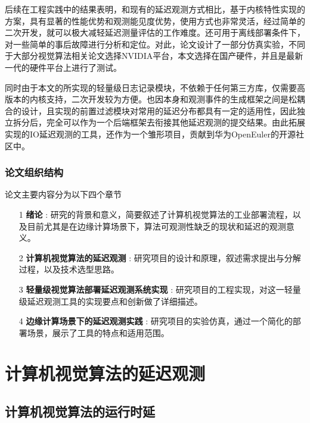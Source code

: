 \documentclass[master,anonymous]{shtthesis}
\begin{document}
后续在工程实践中的结果表明，和现有的延迟观测方式相比，基于内核特性实现的方案，具有显著的性能优势和观测能见度优势，使用方式也非常灵活，经过简单的二次开发，就可以极大减轻延迟测量评估的工作难度。还可用于离线部署条件下，对一些简单的事后故障进行分析和定位。对此，论文设计了一部分仿真实验，不同于大部分视觉算法相关论文选择NVIDIA平台，本文选择在国产硬件，并且是最新一代的硬件平台上进行了测试。

同时由于本文的所实现的轻量级日志记录模块，不依赖于任何第三方库，仅需要高版本的内核支持，二次开发较为方便。也因本身和观测事件的生成框架之间是松耦合的设计，且实现的前置过滤模块对常用的延迟分布都具有一定的适用性，因此独立拆分后，完全可以作为一个后端框架去衔接其他延迟观测的提交结果。由此拓展实现的IO延迟观测的工具，还作为一个雏形项目，贡献到华为OpenEuler的开源社区中\cite{stortrace}。

\subsection{论文组织结构}\label{论文组织结构}
论文主要内容分为以下四个章节
\begin{itemize}
	\item[1]\textbf{绪论} : 研究的背景和意义，简要叙述了计算机视觉算法的工业部署流程，以及目前尤其是在边缘计算场景下，算法可观测性缺乏的现状和延迟的观测意义。
	\item[2]\textbf{计算机视觉算法的延迟观测} : 研究项目的设计和原理，叙述需求提出与分解过程，以及技术选型思路。
	\item[3]\textbf{轻量级视觉算法部署延迟观测系统实现} : 研究项目的工程实现，对这一轻量级延迟观测工具的实现要点和创新做了详细描述。
	\item[4]\textbf{边缘计算场景下的延迟观测实践} : 研究项目的实验仿真，通过一个简化的部署场景，展示了工具的特点和适用范围。
\end{itemize}



\chapter{计算机视觉算法的延迟观测}\label{计算机视觉算法的延迟观测}
\section{计算机视觉算法的运行时延}\label{计算机视觉算法的运行时延}
\end{document}
